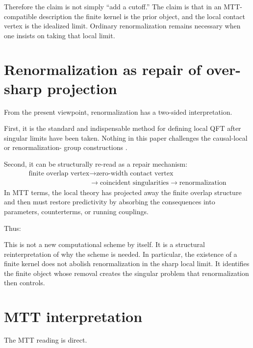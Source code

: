 \documentclass[11pt]{article}
\begin{document}
Therefore the claim is not simply ``add a cutoff.''  The claim is that in an MTT-compatible
description the finite kernel is the prior object, and the local contact vertex is the idealized
limit.  Ordinary renormalization remains necessary when one insists on taking that local
limit.

\section{Renormalization as repair of over-sharp projection}

From the present viewpoint, renormalization has a two-sided interpretation.

First, it is the standard and indispensable method for defining local QFT after singular
limits have been taken.  Nothing in this paper challenges the causal-local or renormalization-
group constructions \cite{EpsteinGlaser1973,WilsonKogut1974}.

Second, it can be structurally re-read as a repair mechanism:
\[
\begin{array}{c}
\text{finite overlap vertex}\longrightarrow\text{zero-width contact vertex}\\
\phantom{\text{finite overlap vertex}}\longrightarrow
\text{coincident singularities}\longrightarrow\text{renormalization}
\end{array}
\]
In MTT terms, the local theory has projected away the finite overlap structure and then must
restore predictivity by absorbing the consequences into parameters, counterterms, or running
couplings.

Thus:
\begin{center}
\end{center}
This is not a new computational scheme by itself.  It is a structural reinterpretation of why
the scheme is needed.  In particular, the existence of a finite kernel does not abolish
renormalization in the sharp local limit.  It identifies the finite object whose removal creates
the singular problem that renormalization then controls.

\section{MTT interpretation}

The MTT reading is direct.
\end{document}
